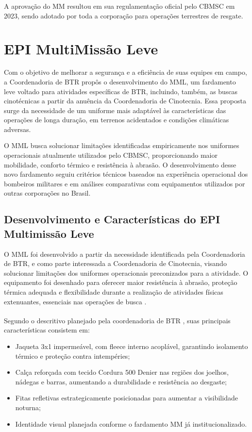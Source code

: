 A aprovação do \acrlong{MM} resultou em sua regulamentação oficial pelo \acrshort{CBMSC} em 2023, sendo adotado por toda a corporação para operações terrestres de resgate.

\section{EPI MultiMissão Leve}

Com o objetivo de melhorar a segurança e a eficiência de suas equipes em campo, a Coordenadoria de \acrlong{BTR} propôs o desenvolvimento do \acrfull{MML}, um fardamento leve voltado para atividades específicas de \acrlong{BTR}, incluindo, também, as buscas cinotécnicas a partir da anuência da Coordenadoria de Cinotecnia. Essa proposta surge da necessidade de um uniforme mais adaptável às características das operações de longa duração, em terrenos acidentados e condições climáticas adversas.

O \acrshort{MML} busca solucionar limitações identificadas empiricamente nos uniformes operacionais atualmente utilizados pelo \acrshort{CBMSC}, proporcionando maior mobilidade, conforto térmico e resistência à abrasão. O desenvolvimento desse novo fardamento seguiu critérios técnicos baseados na experiência operacional dos bombeiros militares e em análises comparativas com equipamentos utilizados por outras corporações no Brasil.

\subsection{Desenvolvimento e Características do EPI Multimissão Leve}
O \acrlong{MML} foi desenvolvido a partir da necessidade identificada pela Coordenadoria de \acrshort{BTR}, e como parte interessada a Coordenadoria de Cinotecnia, visando solucionar limitações dos uniformes operacionais preconizados para a atividade. O equipamento foi desenhado para oferecer maior resistência à abrasão, proteção térmica adequada e flexibilidade durante a realização de atividades físicas extenuantes, essenciais nas operações de busca \cite{relMML}.
\\\\
Segundo o descritivo planejado pela coordenadoria de \acrlong{BTR} \cite{descritivoMML}, suas principais características consistem em:

\begin{itemize}
    \item Jaqueta 3x1 impermeável, com fleece interno acoplável, garantindo isolamento térmico e proteção contra intempéries;
    \item Calça reforçada com tecido Cordura 500 Denier nas regiões dos joelhos, nádegas e barras, aumentando a durabilidade e resistência ao desgaste;
    \item Fitas refletivas estrategicamente posicionadas para aumentar a visibilidade noturna;
    \item Identidade visual planejada conforme o fardamento \acrlong{MM} já institucionalizado.
\end{itemize}


